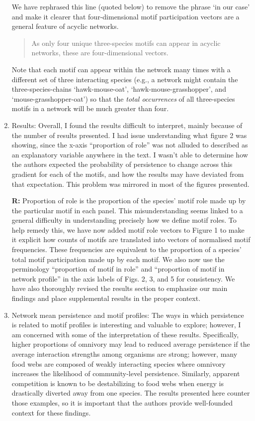 \documentclass[12pt]{article}
\begin{document}
\begin{enumerate}
                We have rephrased this line (quoted below) to remove the phrase `in our case' and make it clearer that four-dimensional motif participation vectors are a general feature of acyclic networks.
                \begin{quotation}
                    As only four unique three-species motifs can appear in acyclic networks, these are four-dimensional vectors. 
                \end{quotation}

                Note that each motif can appear within the network many times with a different set of three interacting species (e.g., a network might contain the three-species-chains `hawk-mouse-oat',  `hawk-mouse-grasshopper', and `mouse-grasshopper-oat') so that the \emph{total occurrences} of all three-species motifs in a network will be much greater than four.


            \item Results: Overall, I found the results difficult to interpret, mainly because of the number of results presented. I had issue understanding what figure 2 was showing, since the x-axis ``proportion of role'' was not alluded to described as an explanatory variable anywhere in the text. I wasn't able to determine how the authors expected the probability of persistence to change across this gradient for each of the motifs, and how the results may have deviated from that expectation. This problem was mirrored in most of the figures presented.

                \textbf{R:} Proportion of role is the proportion of the species' motif role made up by the particular motif in each panel. This misunderstanding seems linked to a general difficulty in understanding precisely how we define motif roles. To help remedy this, we have now added motif role vectors to Figure 1 to make it explicit how counts of motifs are translated into vectors of normalised motif frequencies. These frequencies are equivalent to the proportion of a species' total motif participation made up by each motif. We also now use the perminology ``proportion of motif in role'' and ``proportion of motif in network profile'' in the axis labels of Figs. 2, 3, and 5 for consistency. We have also thoroughly revised the results section to emphasize our main findings and place supplemental results in the proper context.


            \item Network mean persistence and motif profiles: The ways in which persistence is related to motif profiles is interesting and valuable to explore; however, I am concerned with some of the interpretation of these results. Specifically, higher proportions of omnivory may lead to reduced average persistence if the average interaction strengths among organisms are strong; however, many food webs are composed of weakly interacting species where omnivory increases the likelihood of community-level persistence. Similarly, apparent competition is known to be destabilizing to food webs when energy is drastically diverted away from one species. The results presented here counter those examples, so it is important that the authors provide well-founded context for these findings.


\end{enumerate}
\end{document}
